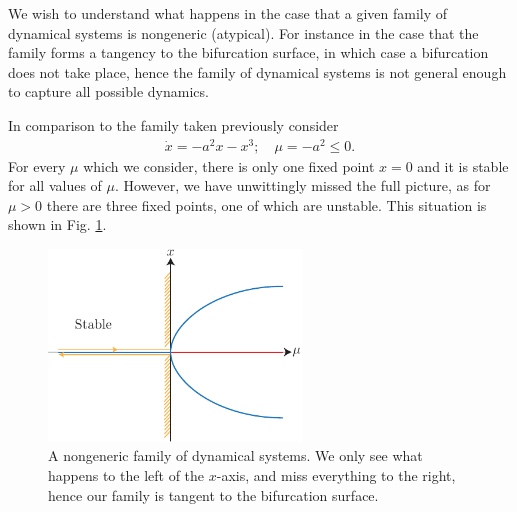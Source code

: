 We wish to understand what happens in the case that a given family of dynamical systems is nongeneric (atypical). For instance in the case that the family forms a tangency to the bifurcation surface, in which case a bifurcation does not take place, hence the family of dynamical systems is not general enough to capture all possible dynamics.

\begin{ex}
	In comparison to the family taken previously consider
	\begin{align}
		 \dot{x} = -a^2 x -x^3;\quad \mu =-a^2\leq 0.
	\end{align}
	For every $\mu $ which we consider, there is only one fixed point $x=0$ and it is stable for all values of $\mu $. However, we have unwittingly missed the full picture, as for $\mu >0$ there are three fixed points, one of which are unstable. This situation is shown in Fig. \ref{fig:nongen_ds}.
	\begin{figure}[h!]
		\centering
		\includegraphics[width=0.6\textwidth]{figures/ch3/10nongen_ds.pdf}
		\caption{A nongeneric family of dynamical systems. We only see what happens to the left of the $x$-axis, and miss everything to the right, hence our family is tangent to the bifurcation surface.}
		\label{fig:nongen_ds}
	\end{figure}
\end{ex}

